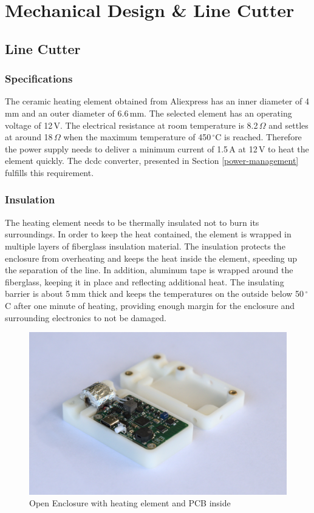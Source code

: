 \newpage
\section{Mechanical Design \& Line Cutter}

\subsection{Line Cutter}

\subsubsection{Specifications}
The ceramic heating element obtained from Aliexpress has an inner diameter of 4\,mm and an outer diameter of 6.6\,mm. The selected element has an operating voltage of 12\,V. The electrical resistance at room temperature is 8.2\,$\Omega$ and settles at around 18\,$\Omega$ when the maximum temperature of 450\,$^\circ$C is reached. Therefore the power supply needs to deliver a minimum current of 1.5\,A at 12\,V to heat the element quickly. The \acrshort{dcdc} converter, presented in Section \ref{power-management} fulfills this requirement. 

\subsubsection{Insulation}
The heating element needs to be thermally insulated not to burn its surroundings. In order to keep the heat contained, the element is wrapped in multiple layers of fiberglass insulation material. The insulation protects the enclosure from overheating and keeps the heat inside the element, speeding up the separation of the line. In addition, aluminum tape is wrapped around the fiberglass, keeping it in place and reflecting additional heat. The insulating barrier is about 5\,mm thick and keeps the temperatures on the outside below 50\,$^\circ$C after one minute of heating, providing enough margin for the enclosure and surrounding electronics to not be damaged.

\begin{figure}[h!]
	\centering
	\includegraphics[width=\textwidth]{images/heating-elemet}
	\caption{Open Enclosure with heating element and PCB inside}
	\label{fig:heating-element}
\end{figure}


